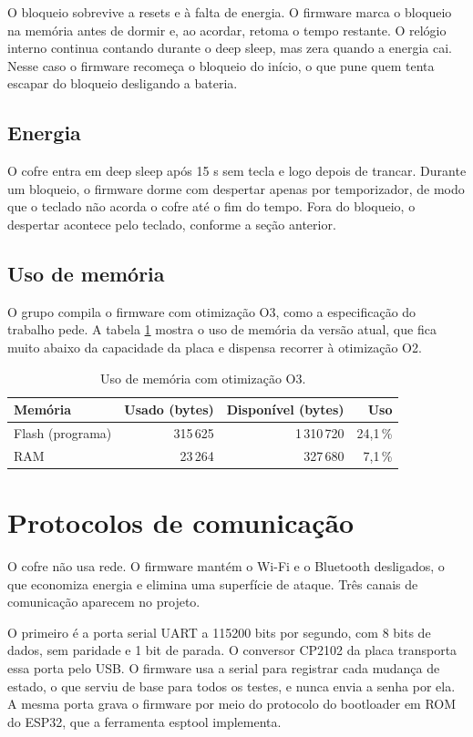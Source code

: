 \documentclass[11pt,a4paper]{article}
\begin{document}
O bloqueio sobrevive a resets e à falta de energia. O firmware marca o bloqueio na memória antes de dormir e, ao acordar, retoma o tempo restante. O relógio interno continua contando durante o deep sleep, mas zera quando a energia cai. Nesse caso o firmware recomeça o bloqueio do início, o que pune quem tenta escapar do bloqueio desligando a bateria.

\subsection{Energia}

O cofre entra em deep sleep após 15 s sem tecla e logo depois de trancar. Durante um bloqueio, o firmware dorme com despertar apenas por temporizador, de modo que o teclado não acorda o cofre até o fim do tempo. Fora do bloqueio, o despertar acontece pelo teclado, conforme a seção anterior.

\subsection{Uso de memória}

O grupo compila o firmware com otimização O3, como a especificação do trabalho pede. A tabela \ref{tab:mem} mostra o uso de memória da versão atual, que fica muito abaixo da capacidade da placa e dispensa recorrer à otimização O2.

\begin{table}[H]\centering\small
\caption{Uso de memória com otimização O3.}\label{tab:mem}
\begin{tabular}{@{}l r r r@{}}
\toprule
Memória & Usado (bytes) & Disponível (bytes) & Uso \\
\midrule
Flash (programa) & 315\,625 & 1\,310\,720 & 24,1\,\% \\
RAM & 23\,264 & 327\,680 & 7,1\,\% \\
\bottomrule
\end{tabular}
\end{table}

\section{Protocolos de comunicação}

O cofre não usa rede. O firmware mantém o Wi-Fi e o Bluetooth desligados, o que economiza energia e elimina uma superfície de ataque. Três canais de comunicação aparecem no projeto.

O primeiro é a porta serial UART a 115200 bits por segundo, com 8 bits de dados, sem paridade e 1 bit de parada. O conversor CP2102 da placa transporta essa porta pelo USB. O firmware usa a serial para registrar cada mudança de estado, o que serviu de base para todos os testes, e nunca envia a senha por ela. A mesma porta grava o firmware por meio do protocolo do bootloader em ROM do ESP32, que a ferramenta esptool implementa.
\end{document}
